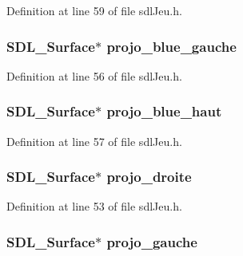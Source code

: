 Definition at line 59 of file sdl\-Jeu.\-h.

\hypertarget{structsdl_jeu_a319f836c1aeb2c6308e8787e7c19977f}{
\subsubsection[{projo\-\_\-blue\-\_\-gauche}]{\setlength{\rightskip}{0pt plus 5cm}S\-D\-L\-\_\-\-Surface$\ast$ projo\-\_\-blue\-\_\-gauche}}\label{structsdl_jeu_a319f836c1aeb2c6308e8787e7c19977f}


Definition at line 56 of file sdl\-Jeu.\-h.

\hypertarget{structsdl_jeu_a199f1dad5defaafc584de63f511c9016}{
\subsubsection[{projo\-\_\-blue\-\_\-haut}]{\setlength{\rightskip}{0pt plus 5cm}S\-D\-L\-\_\-\-Surface$\ast$ projo\-\_\-blue\-\_\-haut}}\label{structsdl_jeu_a199f1dad5defaafc584de63f511c9016}


Definition at line 57 of file sdl\-Jeu.\-h.

\hypertarget{structsdl_jeu_a752f2ccb603dfdb70f4d2da72fb5ccc5}{
\subsubsection[{projo\-\_\-droite}]{\setlength{\rightskip}{0pt plus 5cm}S\-D\-L\-\_\-\-Surface$\ast$ projo\-\_\-droite}}\label{structsdl_jeu_a752f2ccb603dfdb70f4d2da72fb5ccc5}


Definition at line 53 of file sdl\-Jeu.\-h.

\hypertarget{structsdl_jeu_af901fa03839c9ce73b3a49a79e5a417e}{
\subsubsection[{projo\-\_\-gauche}]{\setlength{\rightskip}{0pt plus 5cm}S\-D\-L\-\_\-\-Surface$\ast$ projo\-\_\-gauche}}\label{structsdl_jeu_af901fa03839c9ce73b3a49a79e5a417e}


